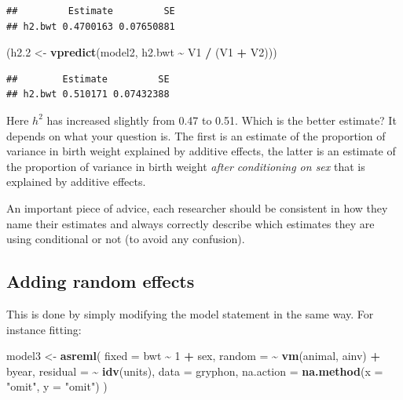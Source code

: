 \documentclass[
  12pt,
]{book}
\newenvironment{Shaded}{\begin{snugshade}}{\end{snugshade}}
\newcommand{\DataTypeTok}[1]{\textcolor[rgb]{0.13,0.29,0.53}{#1}}
\newcommand{\DecValTok}[1]{\textcolor[rgb]{0.00,0.00,0.81}{#1}}
\newcommand{\FloatTok}[1]{\textcolor[rgb]{0.00,0.00,0.81}{#1}}
\newcommand{\KeywordTok}[1]{\textcolor[rgb]{0.13,0.29,0.53}{\textbf{#1}}}
\newcommand{\NormalTok}[1]{#1}
\newcommand{\OperatorTok}[1]{\textcolor[rgb]{0.81,0.36,0.00}{\textbf{#1}}}
\newcommand{\StringTok}[1]{\textcolor[rgb]{0.31,0.60,0.02}{#1}}
\begin{document}
\begin{verbatim}
##         Estimate         SE
## h2.bwt 0.4700163 0.07650881
\end{verbatim}

\begin{Shaded}
\begin{Highlighting}[]
\NormalTok{(h2}\FloatTok{.2}\NormalTok{ \textless{}{-}}\StringTok{ }\KeywordTok{vpredict}\NormalTok{(model2, h2.bwt }\OperatorTok{\textasciitilde{}}\StringTok{ }\NormalTok{V1 }\OperatorTok{/}\StringTok{ }\NormalTok{(V1 }\OperatorTok{+}\StringTok{ }\NormalTok{V2)))}
\end{Highlighting}
\end{Shaded}

\begin{verbatim}
##        Estimate         SE
## h2.bwt 0.510171 0.07432388
\end{verbatim}

Here \(h^2\) has increased slightly from 0.47 to 0.51. Which is the better estimate? It depends on what your question is. The first is an estimate of the proportion of variance in birth weight explained by additive effects, the latter is an estimate of the proportion of variance in birth weight \emph{after conditioning on sex} that is explained by additive effects.

An important piece of advice, each researcher should be consistent in how they name their estimates and always correctly describe which estimates they are using conditional or not (to avoid any confusion).

\hypertarget{adding-random-effects}{%
\subsection{Adding random effects}\label{adding-random-effects}}

This is done by simply modifying the model statement in the same way. For instance fitting:

\begin{Shaded}
\begin{Highlighting}[]
\NormalTok{model3 \textless{}{-}}\StringTok{ }\KeywordTok{asreml}\NormalTok{(}
  \DataTypeTok{fixed =}\NormalTok{ bwt }\OperatorTok{\textasciitilde{}}\StringTok{ }\DecValTok{1} \OperatorTok{+}\StringTok{ }\NormalTok{sex,}
  \DataTypeTok{random =} \OperatorTok{\textasciitilde{}}\StringTok{ }\KeywordTok{vm}\NormalTok{(animal, ainv) }\OperatorTok{+}\StringTok{ }\NormalTok{byear,}
  \DataTypeTok{residual =} \OperatorTok{\textasciitilde{}}\StringTok{ }\KeywordTok{idv}\NormalTok{(units),}
  \DataTypeTok{data =}\NormalTok{ gryphon,}
  \DataTypeTok{na.action =} \KeywordTok{na.method}\NormalTok{(}\DataTypeTok{x =} \StringTok{"omit"}\NormalTok{, }\DataTypeTok{y =} \StringTok{"omit"}\NormalTok{)}
\NormalTok{)}
\end{Highlighting}
\end{Shaded}
\end{document}
